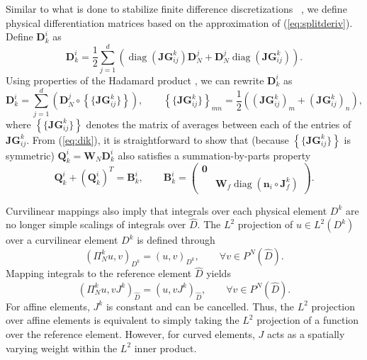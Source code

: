 \documentclass[preprint,10pt]{article}
\theoremstyle{definition}
\theoremstyle{lemma}
\theoremstyle{theorem}
\theoremstyle{assumption}
\DeclareMathOperator{\diag}{diag}
\renewcommand{\hat}{\widehat}
\newcommand{\LRp}[1]{\left( #1 \right)}
\newcommand{\LRc}[1]{\left\{ #1 \right\}}
\newcommand{\avg}[1] {\ensuremath{\LRc{\!\{#1\}\!}}}
\newcommand{\lcwnote}[1]{{\color{gray}{#1}}}
\begin{document}
{Similar to what is done to stabilize finite difference discretizations~\cite{nordstrom2006cfdf} \lcwnote{(Check to see if we can find an earlier reference to this type of approximation.)}, we define physical differentiation matrices based on the approximation of (\ref{eq:splitderiv}).  Define $\bm{D}^i_k$ as
\[
  \bm{D}^i_k = \frac12 \sum_{j=1}^d \left(\diag\LRp{\bm{JG}^k_{ij}}\bm{D}^j_N + \bm{D}^j_N\diag\LRp{\bm{JG}^k_{ij}}\right).
\]
Using properties of the Hadamard product \cite{horn2012matrix}, we can rewrite $\bm{D}^i_k$ as 
\begin{equation}
\bm{D}^i_k = \sum_{j=1}^d \LRp{\bm{D}^j_N \circ \avg{\bm{JG}^k_{ij}}}, \qquad \avg{\bm{JG}^k_{ij}}_{mn} = \frac{1}{2}\LRp{\LRp{\bm{JG}^k_{ij}}_m + \LRp{\bm{JG}^k_{ij}}_n},
\label{eq:dik}
\end{equation}
where $\avg{\bm{JG}^k_{ij}}$ denotes the matrix of averages between each of the entries of $\bm{JG}^k_{ij}$.  From (\ref{eq:dik}), it is straightforward to show that (because $\avg{\bm{JG}^k_{ij}}$ is symmetric) $\bm{Q}^i_k = \bm{W}_N\bm{D}^i_k$ also satisfies a summation-by-parts property
\begin{equation}
\bm{Q}^i_k + \LRp{\bm{Q}^i_k}^T = \bm{B}^i_k, \qquad \bm{B}^i_k = 
\LRp{\begin{array}{cc}
\bm{0}&\\
& \bm{W}_f \diag\LRp{\bm{n}_i\circ\bm{J}^k_f}
\end{array}}.
\label{eq:sbpk}
\end{equation}

Curvilinear mappings also imply that integrals over each physical element $D^k$ are no longer simple scalings of integrals over $\hat{D}$.  The $L^2$ projection of $u\in L^2\LRp{D^k}$ over a curvilinear element $D^k$ is defined through 
\begin{equation}
\LRp{\Pi^k_N u,v}_{D^k} = \LRp{u,v}_{D^k}, \qquad \forall v\in P^N\LRp{\hat{D}}.
\label{eq:l2curv}
\end{equation}
Mapping integrals to the reference element $\hat{D}$ yields
\begin{equation}
\LRp{\Pi^k_N u,v J^k}_{\hat{D}} = \LRp{u,vJ^k}_{\hat{D}}, \qquad \forall v\in P^N\LRp{\hat{D}}.
\label{eq:l2curvmap}
\end{equation}
For affine elements, $J^k$ is constant and can be cancelled.  Thus, the $L^2$ projection over affine elements is equivalent to simply taking the $L^2$ projection of a function over the reference element.  However, for curved elements, $J$ acts as a spatially varying weight within the $L^2$ inner product.  

}
\end{document}
